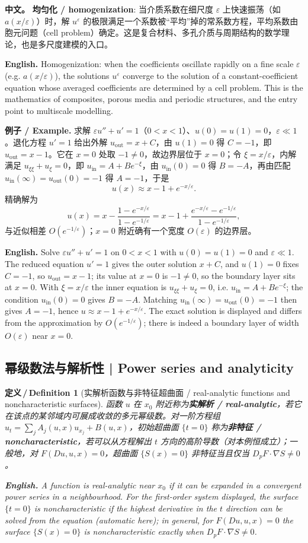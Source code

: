 \documentclass[UTF8,11pt,a4paper]{ctexart}
\newcommand{\APS}[2]{\par\noindent\textbf{中文。} #1\par\noindent\textbf{English.} #2\par\smallskip}
\newcommand{\EN}[1]{\par\noindent \textbf{English.} #1\par}
\newcommand{\EX}[2]{\par\noindent \textbf{例子 / Example.} #1\par\EN{#2}}
\newtheorem{definition}{定义\,/\,Definition}[section]
\begin{document}
\APS{\textbf{均匀化 / homogenization}: 当介质系数在细尺度 $\varepsilon$ 上快速振荡（如 $a(x/\varepsilon)$）时，解 $u^\varepsilon$ 的极限满足一个系数被``平均''掉的常系数方程，平均系数由胞元问题（cell problem）确定。这是复合材料、多孔介质与周期结构的数学理论，也是多尺度建模的入口。}{Homogenization: when the coefficients oscillate rapidly on a fine scale $\varepsilon$ (e.g. $a(x/\varepsilon)$), the solutions $u^\varepsilon$ converge to the solution of a constant-coefficient equation whose averaged coefficients are determined by a cell problem. This is the mathematics of composites, porous media and periodic structures, and the entry point to multiscale modelling.}

\EX{求解 $\varepsilon u''+u'=1$（$0<x<1$）、$u(0)=u(1)=0$，$\varepsilon\ll1$。退化方程 $u'=1$ 给出外解 $u_{\text{out}}=x+C$，由 $u(1)=0$ 得 $C=-1$，即 $u_{\text{out}}=x-1$。它在 $x=0$ 处取 $-1\ne0$，故边界层位于 $x=0$；令 $\xi=x/\varepsilon$，内解满足 $u_{\xi\xi}+u_\xi=0$，即 $u_{\text{in}}=A+Be^{-\xi}$，由 $u_{\text{in}}(0)=0$ 得 $B=-A$，再由匹配 $u_{\text{in}}(\infty)=u_{\text{out}}(0)=-1$ 得 $A=-1$，于是
\[
u(x)\approx x-1+e^{-x/\varepsilon}.
\]
精确解为
\[
u(x)=x-\frac{1-e^{-x/\varepsilon}}{1-e^{-1/\varepsilon}}
=x-1+\frac{e^{-x/\varepsilon}-e^{-1/\varepsilon}}{1-e^{-1/\varepsilon}},
\]
与近似相差 $O(e^{-1/\varepsilon})$；$x=0$ 附近确有一个宽度 $O(\varepsilon)$ 的边界层。}{Solve $\varepsilon u''+u'=1$ on $0<x<1$ with $u(0)=u(1)=0$ and $\varepsilon\ll1$. The reduced equation $u'=1$ gives the outer solution $x+C$, and $u(1)=0$ fixes $C=-1$, so $u_{\text{out}}=x-1$; its value at $x=0$ is $-1\ne0$, so the boundary layer sits at $x=0$. With $\xi=x/\varepsilon$ the inner equation is $u_{\xi\xi}+u_\xi=0$, i.e. $u_{\text{in}}=A+Be^{-\xi}$; the condition $u_{\text{in}}(0)=0$ gives $B=-A$. Matching $u_{\text{in}}(\infty)=u_{\text{out}}(0)=-1$ then gives $A=-1$, hence $u\approx x-1+e^{-x/\varepsilon}$. The exact solution is displayed and differs from the approximation by $O(e^{-1/\varepsilon})$; there is indeed a boundary layer of width $O(\varepsilon)$ near $x=0$.}

\subsection{幂级数法与解析性 | Power series and analyticity}
\begin{definition}[实解析函数与非特征超曲面 / real-analytic functions and noncharacteristic surfaces]\label{def:analytic}
函数 $u$ 在 $x_0$ 附近称为\textbf{实解析 / real-analytic}，若它在该点的某邻域内可展成收敛的多元幂级数。对一阶方程组 $u_t=\sum_jA_j(u,x)u_{x_j}+B(u,x)$，初始超曲面 $\{t=0\}$ 称为\textbf{非特征 / noncharacteristic}，若可以从方程解出 $t$ 方向的高阶导数（对本例恒成立）；一般地，对 $F(Du,u,x)=0$，超曲面 $\{S(x)=0\}$ 非特征当且仅当 $D_pF\cdot\nabla S\ne0$。
\EN{A function is real-analytic near $x_0$ if it can be expanded in a convergent power series in a neighbourhood. For the first-order system displayed, the surface $\{t=0\}$ is noncharacteristic if the highest derivative in the $t$ direction can be solved from the equation (automatic here); in general, for $F(Du,u,x)=0$ the surface $\{S(x)=0\}$ is noncharacteristic exactly when $D_pF\cdot\nabla S\ne0$.}
\end{definition}
\end{document}
